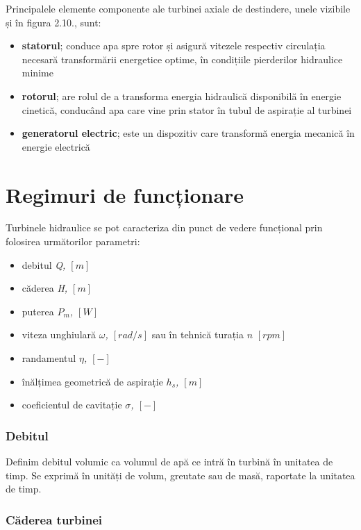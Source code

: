 Principalele elemente componente ale turbinei axiale de destindere, unele vizibile și în figura 2.10., sunt:

\begin{itemize}
	\item \textbf{statorul}; conduce apa spre rotor și asigură vitezele respectiv circulația necesară transformării energetice optime, în condițiile pierderilor hidraulice minime
	\item \textbf{rotorul}; are rolul de a transforma energia hidraulică disponibilă în energie cinetică, conducând apa care vine prin stator în tubul de aspirație al turbinei
	\item \textbf{generatorul electric}; este un dispozitiv care transformă energia mecanică în energie electrică
\end{itemize}


\section{Regimuri de funcționare}

Turbinele hidraulice se pot caracteriza din punct de vedere funcțional prin folosirea următorilor parametri:

\begin{itemize}
	\item debitul \textit{Q, $[\si{m}]$}
	\item căderea \textit{H, $[\si{m}]$}
	\item puterea \textit{$P_m$, $[\si{W}]$}
	\item viteza unghiulară \textit{\(\omega\), $[\si{rad/s}]$} sau în tehnică turația \textit{$n$} \textit{$[\si{rpm}]$}
	\item randamentul \textit{\(\eta\), $[-]$}
	\item înălțimea geometrică de aspirație \textit{\(h_s\), $[\si{m}]$}
	\item coeficientul de cavitație \textit{\(\sigma\), $[-]$}
\end{itemize}


\subsubsection{Debitul}

Definim debitul volumic ca volumul de apă ce intră în turbină în unitatea de timp. Se exprimă în unități de volum, greutate sau de masă, raportate la unitatea de timp.


\subsubsection{Căderea turbinei}

